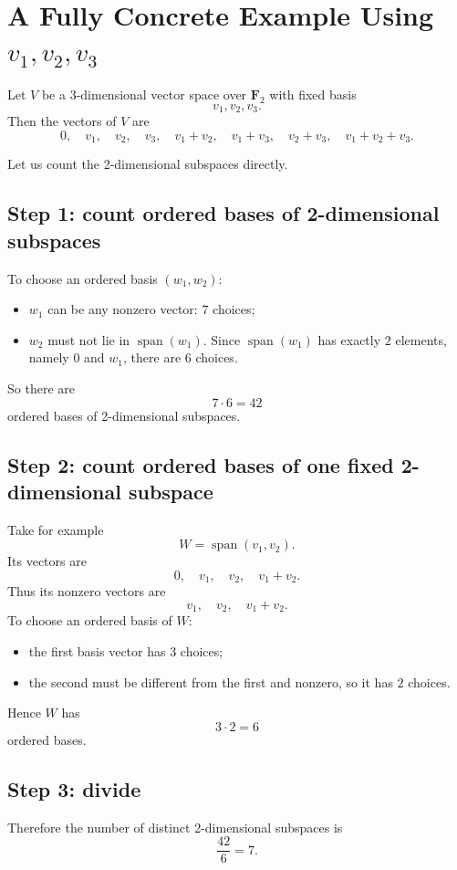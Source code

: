 \documentclass[11pt]{article}
\theoremstyle{definition}
\theoremstyle{remark}
\newcommand{\F}{\mathbf{F}}
\newcommand{\Span}{\operatorname{span}}
\begin{document}
	\section{A Fully Concrete Example Using \(v_1,v_2,v_3\)}
	
	Let \(V\) be a 3-dimensional vector space over \(\F_2\) with fixed basis
	\[
	v_1,v_2,v_3.
	\]
	Then the vectors of \(V\) are
	\[
	0,\quad
	v_1,\quad
	v_2,\quad
	v_3,\quad
	v_1+v_2,\quad
	v_1+v_3,\quad
	v_2+v_3,\quad
	v_1+v_2+v_3.
	\]
	
	Let us count the 2-dimensional subspaces directly.
	
	\subsection*{Step 1: count ordered bases of 2-dimensional subspaces}
	To choose an ordered basis \((w_1,w_2)\):
	
	\begin{itemize}
		\item \(w_1\) can be any nonzero vector: \(7\) choices;
		\item \(w_2\) must not lie in \(\Span(w_1)\). Since \(\Span(w_1)\) has exactly \(2\) elements, namely \(0\) and \(w_1\), there are \(6\) choices.
	\end{itemize}
	
	So there are
	\[
	7\cdot 6=42
	\]
	ordered bases of 2-dimensional subspaces.
	
	\subsection*{Step 2: count ordered bases of one fixed 2-dimensional subspace}
	Take for example
	\[
	W=\Span(v_1,v_2).
	\]
	Its vectors are
	\[
	0,\quad v_1,\quad v_2,\quad v_1+v_2.
	\]
	Thus its nonzero vectors are
	\[
	v_1,\quad v_2,\quad v_1+v_2.
	\]
	To choose an ordered basis of \(W\):
	
	\begin{itemize}
		\item the first basis vector has \(3\) choices;
		\item the second must be different from the first and nonzero, so it has \(2\) choices.
	\end{itemize}
	
	Hence \(W\) has
	\[
	3\cdot 2=6
	\]
	ordered bases.
	
	\subsection*{Step 3: divide}
	Therefore the number of distinct 2-dimensional subspaces is
	\[
	\frac{42}{6}=7.
	\]
	
\end{document}
